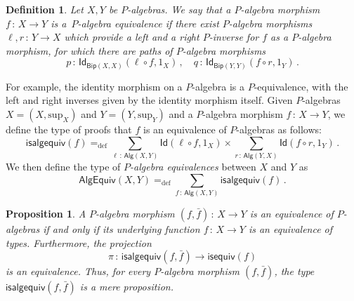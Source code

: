 \documentclass[10pt,a4paper,oneside,reqno]{amsart}
\theoremstyle{mythm}
\newtheorem{proposition}[theorem]{Proposition}
\theoremstyle{mydef}
\newtheorem{definition}[theorem]{Definition}
\theoremstyle{myrmk}
\newcommand{\ie}{\text{i.e.\ }}
\newcommand{\defeq}{=_{\mathrm{def}}}
\newcommand{\co}{\,{:}\,}
\newcommand{\Id}{\mathsf{Id}}
\newcommand{\Bip}{\mathsf{Bip}}
\newcommand{\Palg}{\mathsf{Alg}}
\renewcommand{\sup}{\mathrm{sup}}
\newcommand{\isalgequiv}{\mathsf{isalgequiv}}
\newcommand{\AlgEquiv}{\mathsf{AlgEquiv}}
\begin{document}
\medskip



\begin{definition} Let $X, Y$ be $P$-algebras. We say that a $P$-algebra morphism $f \co X \to Y$ is 
 a~\emph{$P$-algebra equivalence}
if there exist $P$-algebra morphisms $\ell,r \co Y \to X$  which provide a left and a right $P$-inverse for $f$ as a
$P$-algebra morphism, \ie for
which there are paths of $P$-algebra morphisms
\[ 
p \co \Id_{\Bip(X,X)}( \ell \circ f,  1_X) \, , \quad q \co \Id_{\Bip(Y,Y)}( f \circ r , 1_Y) \, .
\]
\end{definition}

For example, the identity morphism on a $P$-algebra is a $P$-equivalence, with the left and right inverses given by the identity morphism itself.  Given $P$-algebras $X = (X, \sup_X)$ and $Y = (Y, \sup_Y)$ and a $P$-algebra morphism $f \co X \to Y$, we define the type of proofs that $f$ is an equivalence of $P$-algebras as follows:
\[
\isalgequiv(f) \defeq   \sum_{\ell \co  \Palg(X,Y)} \Id( \ell \circ f, 1_X )  \times 
    \sum_{r  \co \Palg(Y, X)} \Id( f \circ r , 1_Y ) \, .
\]
We then define the type of \emph{$P$-algebra equivalences} between $X$ and $Y$ as
\[
\AlgEquiv(X, Y)
\defeq    \sum_{f \co \Palg(X,Y)} \isalgequiv(f)  \, . 
\] 


\begin{proposition}\label{WAlgSpace} A $P$-algebra morphism $(f, \bar{f}) \co X \to Y$ is an equivalence of
$P$-algebras if and only
if its underlying function $f \co X \to Y$ is an equivalence of types. Furthermore, the projection
\[
\pi \co \isalgequiv(f, \bar{f})  \to \mathsf{isequiv}(f)  
\]
is an equivalence. Thus, for every $P$-algebra morphism $(f, \bar{f})$, the type $\isalgequiv(f, \bar{f})$ is
a mere proposition. 
\end{proposition}  
\end{document}
